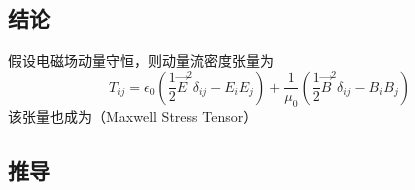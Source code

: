 
\subsection{结论}

假设电磁场动量守恒，则动量流密度张量为
\begin{equation}
{T_{ij}} = {\epsilon_0}\left( {\frac{1}{2}{{\vec E}^2}{\delta _{ij}} - {E_i}{E_j}} \right) + \frac{1}{{{\mu _0}}}\left( {\frac{1}{2}{{\vec B}^2}{\delta _{ij}} - {B_i}{B_j}} \right)
\end{equation} 
该张量也成为（Maxwell Stress Tensor）

\subsection{推导}	

